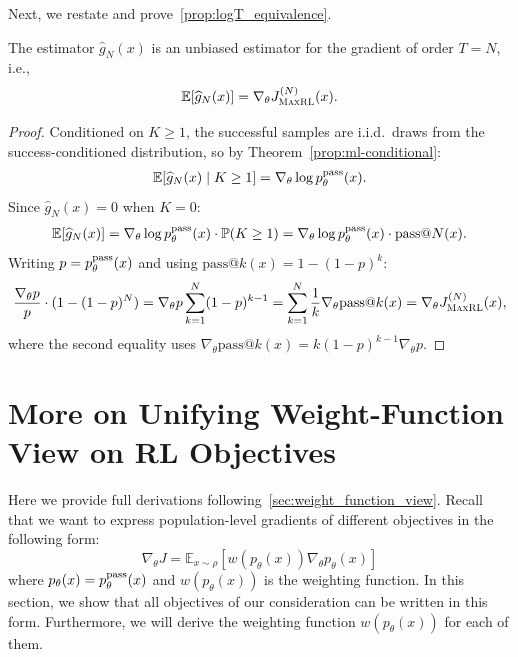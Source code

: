 \documentclass[10pt]{article} %
\begin{document}
Next, we restate and prove~\cref{prop:logT_equivalence}.

\begin{theorem}
The estimator $\widehat{g}_N(x)$ is an unbiased estimator for the \ours{} gradient of order $T = N$, i.e.,
\[
\mathbb{E}\!\left[\widehat{g}_N(x)\right]
=
\nabla_\theta J_{\textsc{MaxRL}}^{(N)}(x).
\]
\end{theorem}

\begin{proof}
Conditioned on $K \geq 1$, the successful samples are i.i.d.\ draws from the success-conditioned distribution, so by Theorem~\ref{prop:ml-conditional}:
\begin{align*}
\mathbb{E}[\widehat{g}_N(x) \mid K \geq 1] = \nabla_\theta \log p^{\mathrm{pass}}_{\theta}(x).
\end{align*}
Since $\widehat{g}_N(x) = 0$ when $K = 0$:
\begin{align*}
\mathbb{E}[\widehat{g}_N(x)] = \nabla_\theta \log p^{\mathrm{pass}}_{\theta}(x) \cdot \mathbb{P}(K \geq 1) = \nabla_\theta \log p^{\mathrm{pass}}_{\theta}(x) \cdot \mathrm{pass@}N(x).
\end{align*}
Writing $p = p^{\mathrm{pass}}_{\theta}(x)$ and using $\mathrm{pass@}k(x) = 1 - (1-p)^k$:
\begin{align*}
\frac{\nabla_\theta p}{p} \cdot (1 - (1-p)^N) = \nabla_\theta p \sum_{k=1}^{N}(1-p)^{k-1} = \sum_{k=1}^{N} \frac{1}{k} \nabla_\theta \mathrm{pass@}k(x) = \nabla_\theta J_{\textsc{MaxRL}}^{(N)}(x),
\end{align*}
where the second equality uses $\nabla_\theta \mathrm{pass@}k(x) = k(1-p)^{k-1}\nabla_\theta p$.
\end{proof}


\newpage

\section{More on Unifying Weight-Function View on RL Objectives} \label{app:weight_function_view_supplements}

Here we provide full derivations following~\cref{sec:weight_function_view}. Recall that we want to express population-level gradients of different objectives in the following form:
\begin{equation*}
    \nabla_\theta J = \mathbb{E}_{x \sim \rho} \left[w(p_\theta(x)) \nabla_\theta p_\theta(x)\right]
\end{equation*}
where $p_\theta(x) = p^{\mathrm{pass}}_{\theta}(x)$ and $w(p_\theta(x))$ is the weighting function. In this section, we show that all objectives of our consideration can be written in this form. Furthermore, we will derive the weighting function $w(p_\theta(x))$ for each of them.
\end{document}
